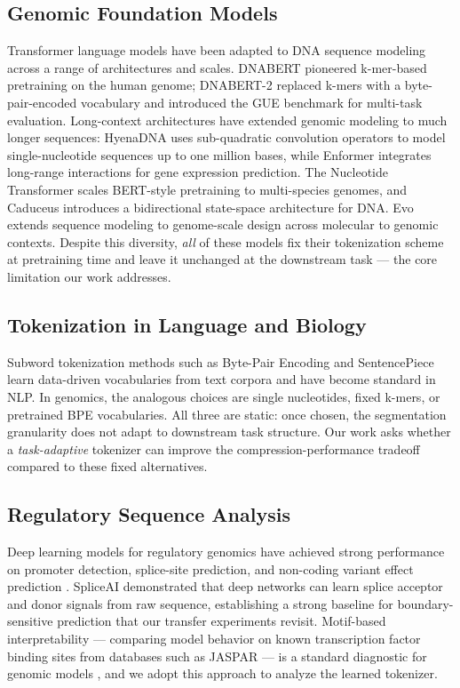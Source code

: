 \documentclass[sigconf,screen]{acmart}
\begin{document}
\subsection{Genomic Foundation Models}
Transformer language models \cite{vaswani2017attention,devlin2019bert,liu2019roberta} have been adapted to DNA sequence modeling across a range of architectures and scales. DNABERT \cite{ji2021dnabert} pioneered k-mer-based pretraining on the human genome; DNABERT-2 \cite{zhou2024dnabert2} replaced k-mers with a byte-pair-encoded vocabulary and introduced the GUE benchmark for multi-task evaluation. Long-context architectures have extended genomic modeling to much longer sequences: HyenaDNA \cite{nguyen2023hyenadna} uses sub-quadratic convolution operators to model single-nucleotide sequences up to one million bases, while Enformer \cite{avsec2021effective} integrates long-range interactions for gene expression prediction. The Nucleotide Transformer \cite{dallatorre2023nucleotide} scales BERT-style pretraining to multi-species genomes, and Caduceus \cite{schiff2024caduceus} introduces a bidirectional state-space architecture for DNA. Evo \cite{nguyen2024sequence} extends sequence modeling to genome-scale design across molecular to genomic contexts. Despite this diversity, \emph{all} of these models fix their tokenization scheme at pretraining time and leave it unchanged at the downstream task — the core limitation our work addresses.

\subsection{Tokenization in Language and Biology}
Subword tokenization methods such as Byte-Pair Encoding \cite{sennrich2016neural} and SentencePiece \cite{kudo2018sentencepiece} learn data-driven vocabularies from text corpora and have become standard in NLP. In genomics, the analogous choices are single nucleotides, fixed k-mers, or pretrained BPE vocabularies. All three are static: once chosen, the segmentation granularity does not adapt to downstream task structure. Our work asks whether a \emph{task-adaptive} tokenizer can improve the compression-performance tradeoff compared to these fixed alternatives.

\subsection{Regulatory Sequence Analysis}
Deep learning models for regulatory genomics have achieved strong performance on promoter detection, splice-site prediction, and non-coding variant effect prediction \cite{zhou2015predicting,kelley2018sequential,jaganathan2019predicting}. SpliceAI \cite{jaganathan2019predicting} demonstrated that deep networks can learn splice acceptor and donor signals from raw sequence, establishing a strong baseline for boundary-sensitive prediction that our transfer experiments revisit. Motif-based interpretability — comparing model behavior on known transcription factor binding sites from databases such as JASPAR \cite{fornes2020jaspar} — is a standard diagnostic for genomic models \cite{avsec2021effective}, and we adopt this approach to analyze the learned tokenizer.
\end{document}
